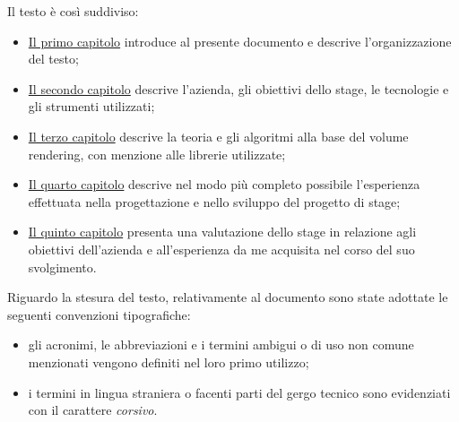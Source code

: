 Il testo è così suddiviso:
\begin{itemize}
    \item \hyperref[cap:introduzione]{Il primo capitolo} introduce al presente documento e descrive l'organizzazione del testo;
    \item \hyperref[cap:descrizione-stage]{Il secondo capitolo} descrive l'azienda, gli obiettivi dello stage, le tecnologie e gli strumenti utilizzati;
    \item \hyperref[cap:teoria-stage]{Il terzo capitolo} descrive la teoria e gli algoritmi alla base del volume rendering, con menzione alle librerie utilizzate;
    \item \hyperref[cap:resoconto-stage]{Il quarto capitolo} descrive nel modo più completo possibile l'esperienza effettuata nella progettazione e nello sviluppo del progetto di stage;
	\item \hyperref[cap:conclusioni]{Il quinto capitolo} presenta una valutazione dello stage in relazione agli obiettivi dell'azienda e all'esperienza da me acquisita nel corso del suo svolgimento.
\end{itemize}


Riguardo la stesura del testo, relativamente al documento sono state adottate le seguenti convenzioni tipografiche:
\begin{itemize}
	\item gli acronimi, le abbreviazioni e i termini ambigui o di uso non comune menzionati vengono definiti nel loro primo utilizzo;
	\item i termini in lingua straniera o facenti parti del gergo tecnico sono evidenziati con il carattere \emph{corsivo}.
\end{itemize}